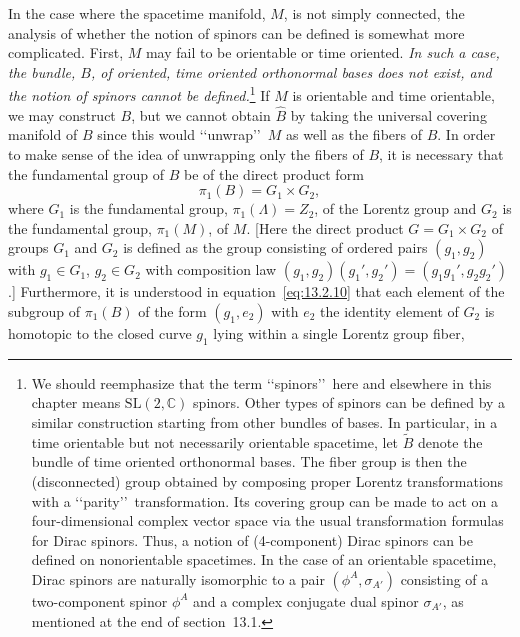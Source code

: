 In the case where the spacetime manifold, \(M\), is not simply connected, the
analysis of whether the notion of spinors can be defined is somewhat more
complicated. First, \(M\) may fail to be orientable or time oriented. \emph{In such
a case, the bundle, \(B\), of oriented, time oriented orthonormal bases does not
exist, and the notion of spinors cannot be defined.}\footnote{We should reemphasize
that the term \lq\lq spinors\rq\rq\ here and elsewhere in this chapter means
\(\mathrm{SL}(2,\mathbb C)\) spinors. Other types of spinors can be defined by a
similar construction starting from other bundles of bases. In particular, in a time
orientable but not necessarily orientable spacetime, let \(\widetilde B\) denote the
bundle of time oriented orthonormal bases. The fiber group is then the
(disconnected) group obtained by composing proper Lorentz transformations with a
\lq\lq parity\rq\rq\ transformation. Its covering group can be made to act on a
four-dimensional complex vector space via the usual transformation formulas for
Dirac spinors. Thus, a notion of (4-component) Dirac spinors can be defined on
nonorientable spacetimes. In the case of an orientable spacetime, Dirac spinors are
naturally isomorphic to a pair \((\phi^A,\sigma_{A'})\) consisting of a
two-component spinor \(\phi^A\) and a complex conjugate dual spinor
\(\sigma_{A'}\), as mentioned at the end of section~13.1.} If \(M\) is orientable
and time orientable, we may construct \(B\), but we cannot obtain \(\widehat B\) by
taking the universal covering manifold of \(B\) since this would \lq\lq unwrap\rq\rq\
\(M\) as well as the fibers of \(B\). In order to make sense of the idea of
unwrapping only the fibers of \(B\), it is necessary that the fundamental group of
\(B\) be of the direct product form
\begin{equation}
  \pi_1(B)=G_1\times G_2,
  \tag{13.2.10}\label{eq:13.2.10}
\end{equation}
where \(G_1\) is the fundamental group, \(\pi_1(\Lambda)=Z_2\), of the Lorentz
group and \(G_2\) is the fundamental group, \(\pi_1(M)\), of \(M\). [Here the direct
product \(G=G_1\times G_2\) of groups \(G_1\) and \(G_2\) is defined as the group
consisting of ordered pairs \((g_1,g_2)\) with \(g_1\in G_1\), \(g_2\in G_2\) with
composition law \((g_1,g_2)(g_1',g_2')=(g_1g_1',g_2g_2')\).] Furthermore, it is
understood in equation~\eqref{eq:13.2.10} that each element of the subgroup of
\(\pi_1(B)\) of the form \((g_1,e_2)\) with \(e_2\) the identity element of \(G_2\)
is homotopic to the closed curve \(g_1\) lying within a single Lorentz group fiber,
